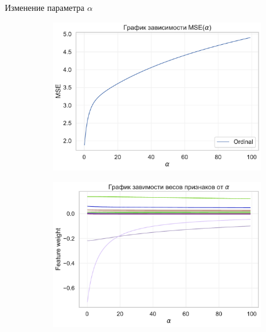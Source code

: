 \documentclass{beamer} %
\begin{document}
\begin{frame}{Изменение параметра $\alpha$}
\begin{figure}
\begin{subfigure}[b]{0.475\textwidth}
                \includegraphics[width=\textwidth]{MSE_plot_1.pdf}
            \end{subfigure}
            \hfill
            \begin{subfigure}[b]{0.475\textwidth}   
                \centering 
                \includegraphics[width=\textwidth]{feature_plot_1.pdf}
            \end{subfigure} 
        \end{figure}
    \end{frame}
\end{document}
